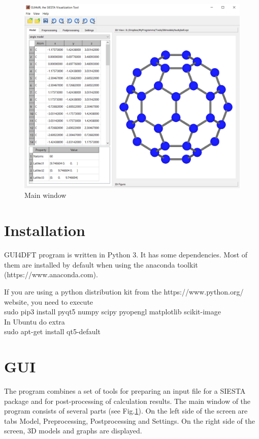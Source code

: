 \documentclass{article}
\begin{document}
\begin{figure}[h!]
	\centering
	\includegraphics[width=5.0in]{mainwindow}
	\caption{Main window}
	\label{fig:mainwindow}
\end{figure}

\section{Installation}
GUI4DFT program is written in Python 3. It has some dependencies. Most of them are installed by default when using the anaconda toolkit \\(https://www.anaconda.com).

If you are using a python distribution kit from the https://www.python.org/ website, you need to execute \\ 
sudo pip3 install pyqt5 numpy scipy pyopengl matplotlib scikit-image \\
In Ubuntu do extra\\
sudo apt-get install qt5-default
	
\section{GUI}

The program combines a set of tools for preparing an input file for a SIESTA package and for post-processing of calculation results. The main window of the program consists of several parts (see Fig.\ref{fig:mainwindow}). On the left side of the screen are tabs Model, Preprocessing, Postprocessing and Settings. On the right side of the screen, 3D models and graphs are displayed.
	
\end{document}
